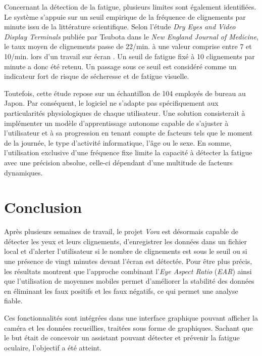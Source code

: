 \documentclass{rapportbrebeuf}
\begin{document}

Concernant la détection de la fatigue, plusieurs limites sont également identifiées. Le système s'appuie sur un seuil empirique de la fréquence de clignements par minute issu de la littérature scientifique. Selon l'étude \textit{Dry Eyes and Video Display Terminals} publiée par Tsubota dans le \textit{New England Journal of Medicine}, le taux moyen de clignements passe de 22/min. à une valeur comprise entre 7 et 10/min. lors d'un travail sur écran \cite{tsubota1993dryeyes}. Un seuil de fatigue fixé à 10 clignements par minute a donc été retenu. Un passage sous ce seuil est considéré comme un indicateur fort de risque de sécheresse et de fatigue visuelle.

Toutefois, cette étude repose sur un échantillon de 104 employés de bureau au Japon. Par conséquent, le logiciel ne s'adapte pas spécifiquement aux particularités physiologiques de chaque utilisateur. Une solution consisterait à implémenter un modèle d'apprentissage autonome capable de s'ajuster à l'utilisateur et à sa progression en tenant compte de facteurs tels que le moment de la journée, le type d'activité informatique, l'âge ou le sexe. En somme, l'utilisation exclusive d'une fréquence fixe limite la capacité à détecter la fatigue avec une précision absolue, celle-ci dépendant d'une multitude de facteurs dynamiques.

\newpage
\section{Conclusion}

Après plusieurs semaines de travail, le projet \textit{Vora} est désormais capable de détecter les yeux et leurs clignements, d’enregistrer les données dans un fichier local et d’alerter l’utilisateur si le nombre de clignements est sous le seuil ou si une présence de vingt minutes devant l’écran est détectée. Pour être plus précis, les résultats montrent que l’approche combinant l’\textit{Eye Aspect Ratio} (\textit{EAR}) ainsi que l’utilisation de moyennes mobiles permet d’améliorer la stabilité des données en éliminant les faux positifs et les faux négatifs, ce qui permet une analyse fiable. 

Ces fonctionnalités sont intégrées dans une interface graphique pouvant afficher la caméra et les données recueillies, traitées sous forme de graphiques. Sachant que le but était de concevoir un assistant pouvant détecter et prévenir la fatigue oculaire, l’objectif a été atteint. 
\end{document}
